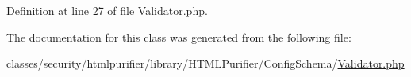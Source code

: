 Definition at line 27 of file Validator.\+php.



The documentation for this class was generated from the following file\+:\begin{DoxyCompactItemize}
\item 
classes/security/htmlpurifier/library/\+H\+T\+M\+L\+Purifier/\+Config\+Schema/\hyperlink{Validator_8php}{Validator.\+php}\end{DoxyCompactItemize}
